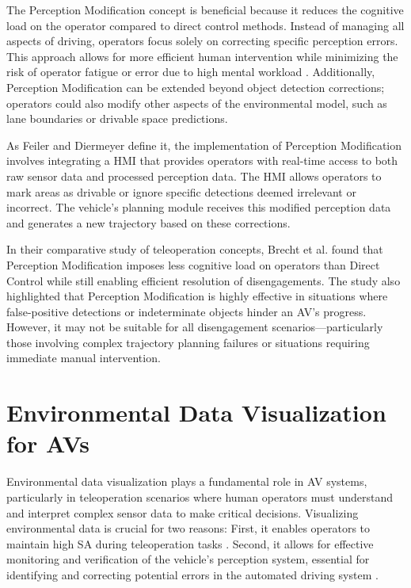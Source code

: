 The Perception Modification concept is beneficial because
it reduces the cognitive load on the operator compared to direct control methods.
Instead of managing all aspects of driving, operators focus solely on correcting
specific perception errors. This approach allows for more efficient human
intervention while minimizing the risk of operator fatigue or error due to
high mental workload \cite{Brecht}. Additionally, Perception Modification can
be extended beyond object detection corrections; operators could also modify other
aspects of the environmental model, such as lane boundaries or drivable space predictions.

As Feiler and Diermeyer \cite{Feiler2021ThePM} define it, the implementation of
Perception Modification involves integrating a  \ac{HMI} that provides operators with real-time access to both raw sensor data and processed perception data. The HMI allows operators to
mark areas as drivable or ignore specific detections deemed irrelevant or incorrect. The vehicle's planning module receives this modified perception data and generates a new trajectory based on these corrections.

In their comparative study of teleoperation concepts, Brecht et al. \cite{Brecht} found
that Perception Modification imposes less cognitive load on operators than
Direct Control while still enabling efficient resolution of disengagements.
The study also highlighted that Perception Modification is highly effective in
situations where false-positive detections or indeterminate objects hinder an AV's progress.
However, it may not be suitable for all disengagement scenarios—particularly those
involving complex trajectory planning failures or situations requiring immediate manual intervention.

\section{Environmental Data Visualization for \acp{AV}}
Environmental data visualization plays a fundamental role in \ac{AV} systems,
particularly in teleoperation scenarios where human operators must understand and interpret
complex sensor data to make critical decisions.
Visualizing environmental data is crucial for two reasons: First, it enables operators to
maintain high \ac{SA} during
teleoperation tasks \cite{Gnatzig}. Second, it allows for effective monitoring and verification
of the vehicle's perception system, essential for identifying and correcting potential errors
in the automated driving system \cite{Feiler2021ThePM}.

